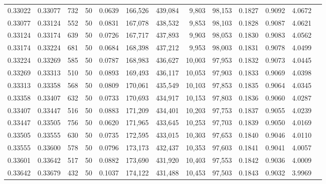 \begin{tabular}{rrrrrrrrrrrrr}
0.33022 & 0.33077 &   732 &  50 &                                     0.0639 & 166,526 & 439,084 &   9,803 &  98,153 & 0.1827 & 0.9092 & 4.0672 \\
0.33077 & 0.33124 &   552 &  50 &                                     0.0831 & 167,078 & 438,532 &   9,853 &  98,103 & 0.1828 & 0.9087 & 4.0621 \\
0.33124 & 0.33174 &   639 &  50 &                                     0.0726 & 167,717 & 437,893 &   9,903 &  98,053 & 0.1830 & 0.9083 & 4.0562 \\
0.33174 & 0.33224 &   681 &  50 &                                     0.0684 & 168,398 & 437,212 &   9,953 &  98,003 & 0.1831 & 0.9078 & 4.0499 \\
0.33224 & 0.33269 &   585 &  50 &                                     0.0787 & 168,983 & 436,627 &  10,003 &  97,953 & 0.1832 & 0.9073 & 4.0445 \\
0.33269 & 0.33313 &   510 &  50 &                                     0.0893 & 169,493 & 436,117 &  10,053 &  97,903 & 0.1833 & 0.9069 & 4.0398 \\
0.33313 & 0.33358 &   568 &  50 &                                     0.0809 & 170,061 & 435,549 &  10,103 &  97,853 & 0.1835 & 0.9064 & 4.0345 \\
0.33358 & 0.33407 &   632 &  50 &                                     0.0733 & 170,693 & 434,917 &  10,153 &  97,803 & 0.1836 & 0.9060 & 4.0287 \\
0.33407 & 0.33447 &   516 &  50 &                                     0.0883 & 171,209 & 434,401 &  10,203 &  97,753 & 0.1837 & 0.9055 & 4.0239 \\
0.33447 & 0.33505 &   756 &  50 &                                     0.0620 & 171,965 & 433,645 &  10,253 &  97,703 & 0.1839 & 0.9050 & 4.0169 \\
0.33505 & 0.33555 &   630 &  50 &                                     0.0735 & 172,595 & 433,015 &  10,303 &  97,653 & 0.1840 & 0.9046 & 4.0110 \\
0.33555 & 0.33600 &   578 &  50 &                                     0.0796 & 173,173 & 432,437 &  10,353 &  97,603 & 0.1841 & 0.9041 & 4.0057 \\
0.33601 & 0.33642 &   517 &  50 &                                     0.0882 & 173,690 & 431,920 &  10,403 &  97,553 & 0.1842 & 0.9036 & 4.0009 \\
0.33642 & 0.33679 &   432 &  50 &                                     0.1037 & 174,122 & 431,488 &  10,453 &  97,503 & 0.1843 & 0.9032 & 3.9969 \\

\end{tabular}
